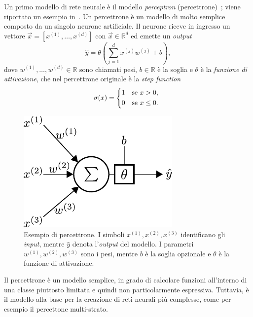 Un primo modello di rete neurale è il modello \emph{perceptron} (percettrone)~\cite{1958_perceptron}; viene riportato un esempio in~.
Un percettrone è un modello di molto semplice composto da un singolo neurone artificiale.
Il neurone riceve in ingresso un vettore $\Vec{x}=[x^{(1)},\dots,x^{(d)}]$ con $\Vec{x} \in \mathbb{R}^d$ ed emette un \emph{output} 
\begin{equation*}
    \hat{y} = \theta\left(\sum_{j=1}^{d}x^{(j)}w^{(j)} +b\right),
\end{equation*} 
dove $w^{(1)},\dots,w^{(d)} \in \mathbb{R}$ sono chiamati pesi, $b \in \mathbb{R}$ è la soglia e $\theta$ è la \emph{funzione di attivazione}, che nel percettrone originale è la \emph{step function} 
\begin{equation*}
    \sigma(x) =
    \begin{cases*}
      1 & se $x>0$, \\
      0 & se $x\leq0$.
    \end{cases*}
\end{equation*}
\begin{figure}
    \centering
    \includegraphics[width=0.3\linewidth]{img/perceptron.pdf}
    \caption[Esempio percettrone.]{Esempio di percettrone. I simboli $x^{(1)},x^{(2)},x^{(3)}$ identificano gli \emph{input}, mentre $\hat{y}$ denota l'\emph{output} del modello. I parametri $w^{(1)},w^{(2)},w^{(3)}$ sono i pesi, mentre $b$ è la soglia opzionale e $\theta$ è la funzione di attivazione.}
    \label{fig:perceptron}
\end{figure}
Il percettrone è un modello semplice, in grado di calcolare funzioni all'interno di una classe piuttosto limitata e quindi non particolarmente espressiva.
Tuttavia, è il modello alla base per la creazione di reti neurali più complesse, come per esempio il percettone multi-strato.

